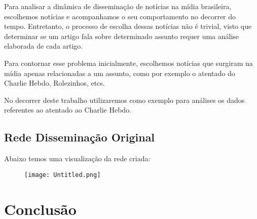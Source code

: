 \documentclass[a4paper,12pt]{article}
\begin{document}
Para analisar a dinâmica de disseminação de notícias na mídia brasileira, escolhemos notícias e acompanhamos o seu comportamento no decorrer 
do tempo.
Entretanto, o processo de escolha dessas notícias não é trivial, visto que determinar se um artigo fala sobre determinado assunto requer
uma análise elaborada de cada artigo.

Para contornar esse problema inicialmente, escolhemos notícias que surgiram na mídia apenas relacionadas a um assunto, como por exemplo o atentado
do Charlie Hebdo, Rolezinhos, etcs.

No decorrer deste trabalho utilizaremos como exemplo para análises os dados referentes ao atentado ao Charlie Hebdo.
  

  \pagebreak

\subsection{Rede Disseminação Original}

Abaixo temos uma visualização da
 rede criada:

 \begin{figure}[h]
 \centering
 \texttt{[image: Untitled.png]}
\end{figure}


\section{Conclusão}
\end{document}
